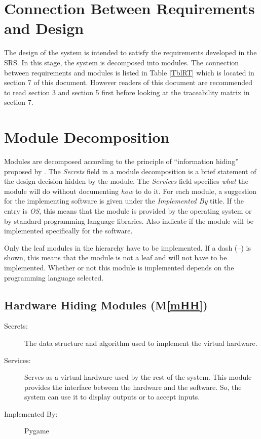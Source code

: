 \documentclass[12pt, titlepage]{article}
\newcommand{\mref}[1]{M\ref{#1}}
\begin{document}
\newpage
\section{Connection Between Requirements and Design} \label{SecConnection}

The design of the system is intended to satisfy the requirements developed in
the SRS. In this stage, the system is decomposed into modules. The connection
between requirements and modules is listed in Table \ref{TblRT} which is located in section 7 of this document. However readers of this document are recommended to read section 3 and section 5 first before looking at the traceability matrix in section 7.

\section{Module Decomposition} \label{SecMD}

Modules are decomposed according to the principle of ``information hiding''
proposed by \citet{ParnasEtAl1984}. The \emph{Secrets} field in a module
decomposition is a brief statement of the design decision hidden by the
module. The \emph{Services} field specifies \emph{what} the module will do
without documenting \emph{how} to do it. For each module, a suggestion for the
implementing software is given under the \emph{Implemented By} title. If the
entry is \emph{OS}, this means that the module is provided by the operating
system or by standard programming language libraries.  Also indicate if the
module will be implemented specifically for the software.

Only the leaf modules in the
hierarchy have to be implemented. If a dash (\emph{--}) is shown, this means
that the module is not a leaf and will not have to be implemented. Whether or
not this module is implemented depends on the programming language
selected.

\subsection{Hardware Hiding Modules (\mref{mHH})}

\begin{description}
\item[Secrets:]The data structure and algorithm used to implement the virtual
  hardware.
\item[Services:]Serves as a virtual hardware used by the rest of the
  system. This module provides the interface between the hardware and the
  software. So, the system can use it to display outputs or to accept inputs.
\item[Implemented By:] Pygame
\end{description}
\end{document}
